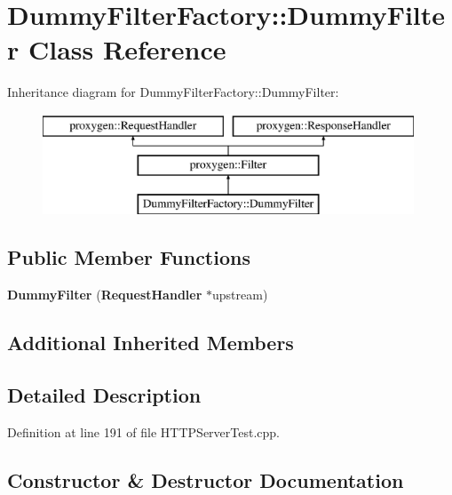 \section{Dummy\+Filter\+Factory\+:\+:Dummy\+Filter Class Reference}
\label{classDummyFilterFactory_1_1DummyFilter}
Inheritance diagram for Dummy\+Filter\+Factory\+:\+:Dummy\+Filter\+:\begin{figure}[H]
\begin{center}
\leavevmode
\includegraphics[height=3.000000cm]{classDummyFilterFactory_1_1DummyFilter}
\end{center}
\end{figure}
\subsection*{Public Member Functions}
\begin{DoxyCompactItemize}
\item 
{\bf Dummy\+Filter} ({\bf Request\+Handler} $\ast$upstream)
\end{DoxyCompactItemize}
\subsection*{Additional Inherited Members}


\subsection{Detailed Description}


Definition at line 191 of file H\+T\+T\+P\+Server\+Test.\+cpp.



\subsection{Constructor \& Destructor Documentation}
